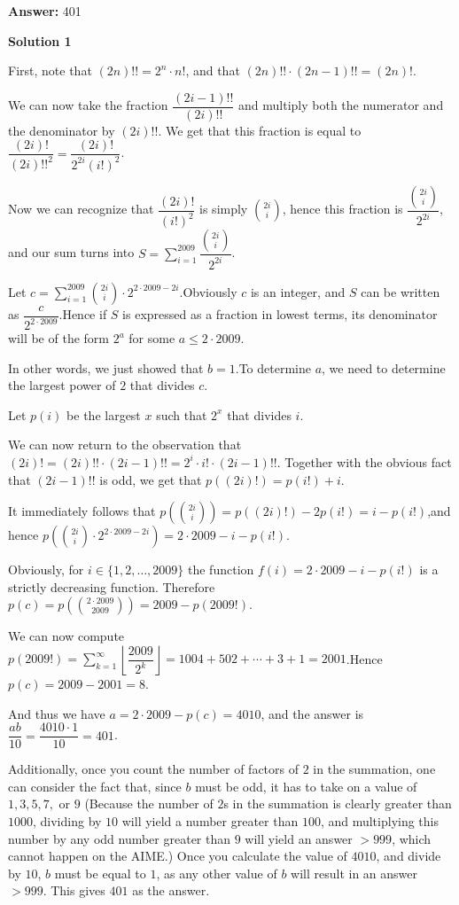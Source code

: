 \begin{enumerate}
 
 \textbf{Answer: }401



\textbf{Solution 1}

First, note that $(2n)!! = 2^n \cdot n!$, and that $(2n)!! \cdot (2n-1)!! = (2n)!$. 

 We can now take the fraction $\dfrac{(2i-1)!!}{(2i)!!}$ and multiply both the numerator and the denominator by $(2i)!!$. We get that this fraction is equal to $\dfrac{(2i)!}{(2i)!!^2} = \dfrac{(2i)!}{2^{2i}(i!)^2}$.

 Now we can recognize that $\dfrac{(2i)!}{(i!)^2}$ is simply ${2i \choose i}$, hence this fraction is $\dfrac{{2i\choose i}}{2^{2i}}$, and our sum turns into $S=\sum_{i=1}^{2009} \dfrac{{2i\choose i}}{2^{2i}}$.

 Let $c = \sum_{i=1}^{2009} {2i\choose i} \cdot 2^{2\cdot 2009 - 2i}$.Obviously $c$ is an integer, and $S$ can be written as $\dfrac{c}{2^{2\cdot 2009}}$.Hence if $S$ is expressed as a fraction in lowest terms, its denominator will be of the form $2^a$ for some $a\leq 2\cdot 2009$. 

 In other words, we just showed that $b=1$.To determine $a$, we need to determine the largest power of $2$ that divides $c$.

 Let $p(i)$ be the largest $x$ such that $2^x$ that divides $i$. 

 We can now return to the observation that $(2i)! = (2i)!! \cdot (2i-1)!! = 2^i \cdot i! \cdot (2i-1)!!$. Together with the obvious fact that $(2i-1)!!$ is odd, we get that $p((2i)!)=p(i!)+i$.

 It immediately follows that $p\left( {2i\choose i} \right) = p((2i)!) - 2p(i!) = i - p(i!)$,and hence $p\left( {2i\choose i} \cdot 2^{2\cdot 2009 - 2i} \right) = 2\cdot 2009 - i - p(i!)$. 

 Obviously, for $i\in\{1,2,\dots,2009\}$ the function $f(i)=2\cdot 2009 - i - p(i!)$ is a strictly decreasing function. Therefore $p(c) = p\left( {2\cdot 2009\choose 2009} \right) = 2009 - p(2009!)$.

 We can now compute $p(2009!) = \sum_{k=1}^{\infty} \left\lfloor \dfrac{2009}{2^k} \right\rfloor = 1004 + 502 + \cdots + 3 + 1 = 2001$.Hence $p(c)=2009-2001=8$.

 And thus we have $a=2\cdot 2009 - p(c) = 4010$, and the answer is $\dfrac{ab}{10} = \dfrac{4010\cdot 1}{10} = \boxed{401}$.

 Additionally, once you count the number of factors of $2$ in the summation, one can consider the fact that, since $b$ must be odd, it has to take on a value of $1,3,5,7,$ or $9$ (Because the number of $2$s in the summation is clearly greater than $1000$, dividing by $10$ will yield a number greater than $100$, and multiplying this number by any odd number greater than $9$ will yield an answer $>999$, which cannot happen on the AIME.) Once you calculate the value of $4010$, and divide by $10$, $b$ must be equal to $1$, as any other value of $b$ will result in an answer $>999$. This gives $\boxed{401}$ as the answer.


\end{enumerate}
